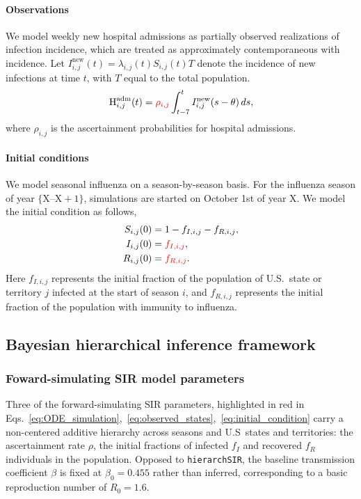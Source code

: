\documentclass[11pt]{article}
\begin{document}
\paragraph{Observations} We model weekly new hospital admissions as partially observed realizations of infection incidence, which are treated as approximately contemporaneous with incidence. Let \( I_{i,j}^{\text{new}}(t) = \lambda_{i,j}(t) S_{i,j}(t) T \) denote the incidence of new infections at time \(t\), with $T$ equal to the total population. 
\begin{equation}\label{eq:observed_states}
    \text{H}^{\text{adm}}_{i,j}(t) 
    = \textcolor{red}{\rho_{i,j}} \int_{t-7}^{t} I^{\text{new}}_{i,j}(s - \theta)\, ds,
\end{equation}
where \( \rho_{i,j} \) is the ascertainment probabilities for hospital admissions.

\paragraph{Initial conditions} We model seasonal influenza on a season-by-season basis. For the influenza season of year $\{\text{X} \text{--} \text{X}+1\}$, simulations are started on October 1st of year $\text{X}$. We model the initial condition as follows,
\begin{align}\label{eq:initial_condition}
    S_{i,j}(0) &= 1- f_{I,i,j}-f_{R,i,j}, \nonumber \\
    I_{i,j}(0) &= \textcolor{red}{f_{I,i,j}}, \nonumber \\
    R_{i,j}(0) &= \textcolor{red}{f_{R,i,j}}. 
\end{align}
Here $f_{I,i,j}$ represents the initial fraction of the population of U.S.\ state or territory $j$ infected at the start of season $i$, and $f_{R,i,j}$ represents the initial fraction of the population with immunity to influenza.

\subsection*{Bayesian hierarchical inference framework}

\subsubsection*{Foward-simulating SIR model parameters}
Three of the forward-simulating SIR parameters, highlighted in red in Eqs.~\eqref{eq:ODE_simulation},~\eqref{eq:observed_states},~\eqref{eq:initial_condition} carry a non-centered additive hierarchy across seasons and U.S\ states and territories: the ascertainment rate $\rho$, the initial fractions of infected $f_I$ and recovered $f_R$ individuals in the population. Opposed to \texttt{hierarchSIR}, the baseline transmission coefficient $\beta$ is fixed at $\beta_0 = 0.455$ rather than inferred, corresponding to a basic reproduction number of $R_0 = 1.6$.\\
\end{document}
